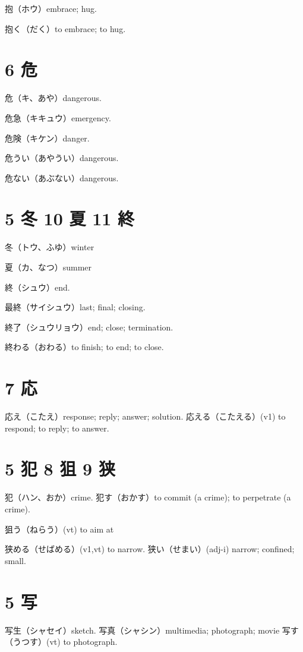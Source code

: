 抱（ホウ）embrace; hug.

抱く（だく）to embrace; to hug.

\section{6 危}

危（キ、あや）dangerous.

危急（キキュウ）emergency.

危険（キケン）danger.

危うい（あやうい）dangerous.

危ない（あぶない）dangerous.

\section{5 冬 10 夏 11 終}

冬（トウ、ふゆ）winter

夏（カ、なつ）summer

終（シュウ）end.

最終（サイシュウ）last; final; closing.

終了（シュウリョウ）end; close; termination.

終わる（おわる）to finish; to end; to close.

\section{7 応}

応え（こたえ）response; reply; answer; solution.
応える（こたえる）(v1) to respond; to reply; to answer.

\section{5 犯 8 狙 9 狭}

犯（ハン、おか）crime.
犯す（おかす）to commit (a crime); to perpetrate (a crime).

狙う（ねらう）(vt) to aim at

狭める（せばめる）(v1,vt) to narrow.
狭い（せまい）(adj-i) narrow; confined; small.

\section{5 写}

写生（シャセイ）sketch.
写真（シャシン）multimedia; photograph; movie
写す（うつす）(vt) to photograph.

